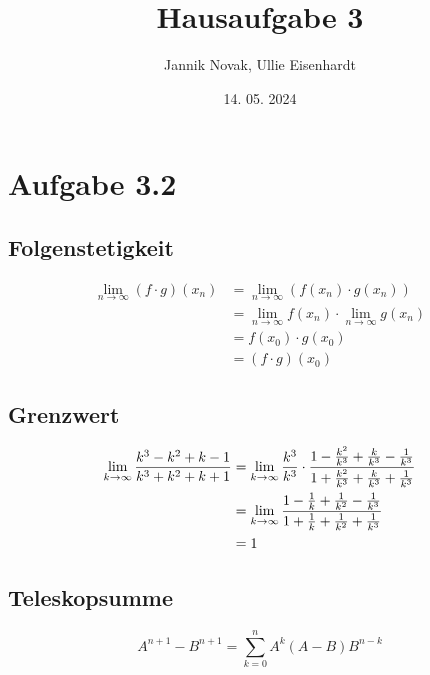 \documentclass{article}
\title{Hausaufgabe 3}
\author{Jannik Novak, Ullie Eisenhardt}
\date{14. 05. 2024}
\begin{document}
\maketitle

\clearpage

\tableofcontents

\clearpage

\section{Aufgabe 3.2}

\subsection{Folgenstetigkeit}

\begin{align*}
    \lim_{n\to\infty} (f \cdot g)(x_n) & = \lim_{n\to\infty} (f(x_n) \cdot g(x_n)) \\
    & = \lim_{n\to\infty} f(x_n) \cdot \lim_{n\to\infty} g(x_n) \\
    & = f(x_0) \cdot g(x_0) \\
    & = (f \cdot g)(x_0)
\end{align*}

\subsection{Grenzwert}

\begin{align}
    \lim_{k\to\infty} {{k^3 - k^2 + k - 1} \over {k^3 + k^2 + k + 1}} 
    & = \lim_{k\to\infty} {{k^3 \over k^3} \cdot {{1 - {k^2 \over k^3} + {k \over k^3} - {1 \over k^3}} \over {1 + {k^2 \over k^3} + {k \over k^3} + {1 \over k^3}}}} \\
    & = \lim_{k\to\infty} {{1 - {1 \over k} + {1 \over k^2} - {1 \over k^3}} \over {1 + {1 \over k} + {1 \over k^2} + {1 \over k^3}}} \\
    & = 1
\end{align}

\subsection{Teleskopsumme}

\begin{equation}
    A^{n+1} - B^{n+1} = \sum_{k=0}^{n} A^k(A-B)B^{n-k}\tag{TKS}
\end{equation}

\clearpage
\end{document}
